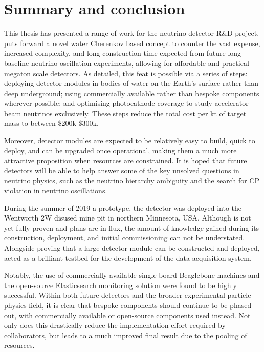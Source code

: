 \chapter{Summary and conclusion} %
\label{chap:conclusion} %

This thesis has presented a range of work for the \chips neutrino detector R\&D project. \chips
puts forward a novel water Cherenkov based concept to counter the vast expense, increased
complexity, and long construction time expected from future long-baseline neutrino oscillation
experiments, allowing for affordable and practical megaton scale detectors. As detailed, this feat
is possible via a series of steps: deploying detector modules in bodies of water on the Earth's
surface rather than deep underground; using commercially available rather than bespoke components
wherever possible; and optimising photocathode coverage to study accelerator beam neutrinos
exclusively. These steps reduce the total cost per kt of target mass to between \$200k-\$300k. 

Moreover, \chips detector modules are expected to be relatively easy to build, quick to deploy,
and can be upgraded once operational, making them a much more attractive proposition when
resources are constrained. It is hoped that future \chips detectors will be able to help answer
some of the key unsolved questions in neutrino physics, such as the neutrino hierarchy ambiguity
and the search for CP violation in neutrino oscillations.

During the summer of 2019 a \chips prototype, the \chipsfive detector was deployed into the
Wentworth 2W disused mine pit in northern Minnesota, USA. Although \chipsfive is not yet fully
proven and plans are in flux, the amount of knowledge gained during its construction, deployment,
and initial commissioning can not be understated. Alongside proving that a large \chips detector
module can be constructed and deployed, \chipsfive acted as a brilliant testbed for the
development of the \chips data acquisition system. 

Notably, the use of commercially available single-board Beaglebone machines and the open-source
Elasticsearch monitoring solution were found to be highly successful. Within both future \chips
detectors and the broader experimental particle physics field, it is clear that bespoke components
should continue to be phased out, with commercially available or open-source components used
instead. Not only does this drastically reduce the implementation effort required by
collaborators, but leads to a much improved final result due to the pooling of resources. 

